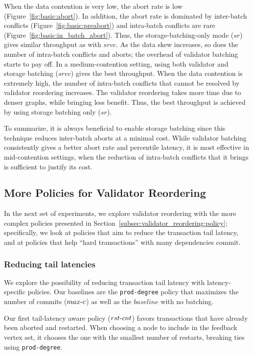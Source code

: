 When the data contention is very low, the abort rate is low (Figure~\ref{fig:basic:abort}). In addition, the abort rate is dominated by inter-batch conflicts (Figure~\ref{fig:basic:preabort}) and intra-batch conflicts are rare (Figure~\ref{fig:basic:in_batch_abort}). Thus, the storage-batching-only mode ($sr$) gives similar throughput as with $srvc$.  As the data skew increases, so does the number of intra-batch conflicts and aborts; the overhead of validator batching starts to pay off. In a medium-contention setting, using both validator and storage batching ($srvc$) gives the best throughput. When the data contention is extremely high, the number of intra-batch conflicts that cannot be resolved by validator reordering increases. The validator reordering takes more time due to denser graphs, while bringing less benefit. Thus, the best throughput is achieved by using storage batching only ($sr$). 

To summarize, it is always beneficial to enable storage batching since this technique reduces inter-batch aborts at a minimal cost. While validator batching consistently gives a better abort rate and percentile latency, it is most effective in mid-contention settings, when the reduction of intra-batch conflicts that it brings is sufficient to justify its cost. 

\subsection{More Policies for Validator Reordering}

In the next set of experiments, we explore validator reordering with the more complex policies presented in Section~\ref{subsec:validator_reordering:policy}; specifically, we look at policies that aim to reduce the transaction tail latency, and at policies that help ``hard transactions'' with many dependencies commit.


\subsubsection{Reducing tail latencies}

We explore the possibility of reducing transaction tail latency with latency-specific policies. Our baselines are the \texttt{prod-degree} policy that maximizes the number of commits ($max\hbox{-}c$) as well as the $baseline$ with no batching. 

Our first tail-latency aware policy ($rst\hbox{-}cnt$) favors transactions that have already been aborted and restarted. When choosing a node to include in the feedback vertex set, it chooses the one with the smallest number of restarts, breaking ties using \texttt{prod-degree}.

